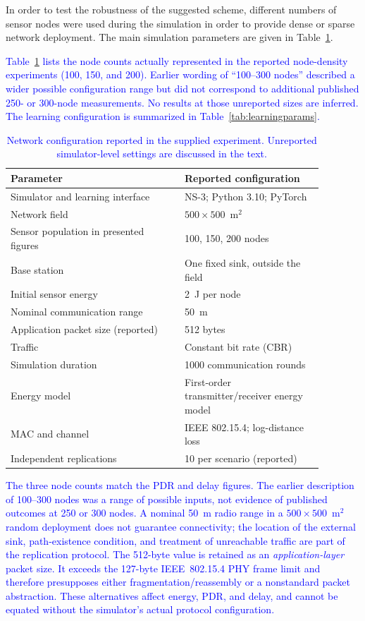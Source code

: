 \documentclass[pdflatex,sn-mathphys-num]{sn-jnl}
\newcommand{\Revised}[1]{\textcolor{blue}{#1}}
\begin{document}
In order to test the robustness of the suggested scheme, different numbers of sensor nodes were used during the simulation in order to provide dense or sparse network deployment. The main simulation parameters are given in Table~\ref{tab:simparams}.

\textcolor{blue}{Table~\ref{tab:simparams} lists the node counts actually represented in the reported node-density experiments (100, 150, and 200). Earlier wording of ``100--300 nodes'' described a wider possible configuration range but did not correspond to additional published 250- or 300-node measurements. No results at those unreported sizes are inferred. The learning configuration is summarized in Table~\ref{tab:learningparams}.}


\begin{table}[ht]
\centering
\caption{\Revised{Network configuration reported in the supplied experiment. Unreported simulator-level settings are discussed in the text.}}
\label{tab:simparams}
\small
\begin{tabular}{p{0.49\linewidth}p{0.39\linewidth}}
\toprule
\textbf{Parameter} & \textbf{Reported configuration}\\
\midrule
Simulator and learning interface & NS-3; Python 3.10; PyTorch\\
Network field & $500\times500$~m$^2$\\
Sensor population in presented figures & 100, 150, 200 nodes\\
Base station & One fixed sink, outside the field\\
Initial sensor energy & 2~J per node\\
Nominal communication range & 50~m\\
Application packet size (reported) & 512 bytes\\
Traffic & Constant bit rate (CBR)\\
Simulation duration & 1000 communication rounds\\
Energy model & First-order transmitter/receiver energy model\\
MAC and channel & IEEE 802.15.4; log-distance loss\\
Independent replications & 10 per scenario (reported)\\
\bottomrule
\end{tabular}
\end{table}

\Revised{The three node counts match the PDR and delay figures. The earlier description of 100--300 nodes was a range of possible inputs, not evidence of published outcomes at 250 or 300 nodes. A nominal 50~m radio range in a $500\times500$~m$^2$ random deployment does not guarantee connectivity; the location of the external sink, path-existence condition, and treatment of unreachable traffic are part of the replication protocol. The 512-byte value is retained as an \emph{application-layer} packet size. It exceeds the 127-byte IEEE~802.15.4 PHY frame limit and therefore presupposes either fragmentation/reassembly or a nonstandard packet abstraction. These alternatives affect energy, PDR, and delay, and cannot be equated without the simulator's actual protocol configuration.}
\end{document}

